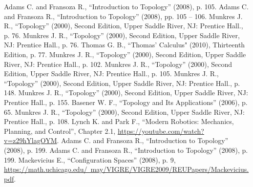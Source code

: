 \documentclass[12pt]{article}
\theoremstyle{definition}
\begin{document}
\begin{center}
\begin{thebibliography}{00}
     Adams C. and Fransoza R., ``Introduction to Topology'' (2008), p. 105.
     Adams C. and Fransoza R., ``Introduction to Topology'' (2008), pp. 105 -- 106.
     Munkres J. R., ``Topology'' (2000), Second Edition, Upper Saddle River, NJ: Prentice Hall., p. 76.
     Munkres J. R., ``Topology'' (2000), Second Edition, Upper Saddle River, NJ: Prentice Hall., p. 76.
     Thomas G. B., ``Thomas' Calculus" (2010), Thirteenth Edition, p. 77.
     Munkres J. R., ``Topology'' (2000), Second Edition, Upper Saddle River, NJ: Prentice Hall., p. 102.
     Munkres J. R., ``Topology'' (2000), Second Edition, Upper Saddle River, NJ: Prentice Hall., p. 105.
     Munkres J. R., ``Topology'' (2000), Second Edition, Upper Saddle River, NJ: Prentice Hall., p. 148.
     Munkres J. R., ``Topology'' (2000), Second Edition, Upper Saddle River, NJ: Prentice Hall., p. 155.
     Basener W. F., ``Topology and Its Applications'' (2006), p. 65.
     Munkres J. R., ``Topology'' (2000), Second Edition, Upper Saddle River, NJ: Prentice Hall., p. 108.
     Lynch K. and Park F., ``Modern Robotics: Mechanics, Planning, and Control'', Chapter 2.1, \href{https://youtube.com/watch?v=z29hYlagOYM}{https://youtube.com/watch?v=z29hYlagOYM}.
     Adams C. and Fransoza R., ``Introduction to Topology'' (2008), p. 199.
     Adams C. and Fransoza R., ``Introduction to Topology'' (2008), p. 199.
     Mackevicius E., ``Configuration Spaces'' (2008), p. 9,\\\href{https://math.uchicago.edu/~may/VIGRE/VIGRE2009/REUPapers/Mackevicius.pdf}{https://math.uchicago.edu/~may/VIGRE/VIGRE2009/REUPapers/Mackevicius.pdf}.
\end{thebibliography}
\end{center}
\end{document}
